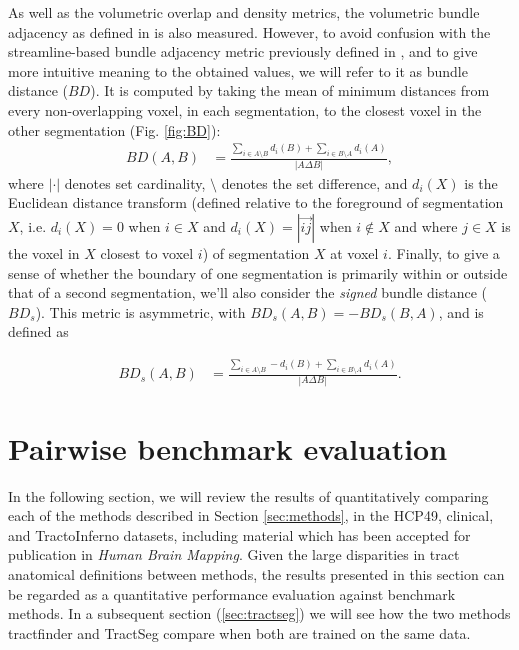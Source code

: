 \documentclass[12pt,phd,a4paper,twoside]{ucl_thesis}
\renewcommand{\textcite}[2][]{
\ifthenelse { \equal {#1} {} }  {\citeauthor{#2}\autocite{#2}}   {\citeauthor{#1}\autocite{#2}}}
\begin{document}
As well as the volumetric overlap and density metrics, the volumetric bundle adjacency as defined in \textcite{Schilling2021a} is also measured.
However, to avoid confusion with the streamline-based bundle adjacency\autocite{Radwan2022, Garyfallidis2012, Rheault2022} metric previously defined in \textcite{Garyfallidis2012},
and to give more intuitive meaning to the obtained values, we will refer to it as bundle distance ($BD$).
It is computed by taking the mean of minimum distances from every non-overlapping voxel, in each segmentation, to the closest voxel in the other segmentation (Fig. \ref{fig:BD}):
\begin{align}
  BD(A,B) &= \frac{\sum_{i \in A\setminus B} d_i(B) + \sum_{i \in B\setminus A} d_i(A)}{|A\Delta B|} \label{eq:bd},
\end{align}
where $| \cdot |$ denotes set cardinality, $\setminus$ denotes the set difference, and $d_i(X)$ is the Euclidean distance transform (defined relative to the foreground of segmentation $X$, i.e. $d_i(X) = 0$ when $i \in X $ and $d_i(X) = |\overrightarrow{ij}|$ when $i \not\in X$ and where $j \in X$ is the voxel in $X$ closest to voxel $i$)  of segmentation $X$ at voxel $i$.
Finally, to give a sense of whether the boundary of one segmentation is primarily within or outside that of a second segmentation, we'll also consider the \textit{signed} bundle distance ($BD_s$).
This metric is asymmetric, with $BD_s (A,B) = -BD_s(B,A)$, and is defined as

\begin{align}
  BD_s(A,B) &= \frac{\sum_{i \in A\setminus B} - d_i(B) + \sum_{i \in B\setminus A} d_i(A)}{|A\Delta B|}. \label{eq:bds}
\end{align}


\section{Pairwise benchmark evaluation}
\label{sec:validation}

In the following section, we will review the results of quantitatively comparing each of the methods described in Section \ref{sec:methods}, in the HCP49, clinical, and TractoInferno datasets, including material which has been accepted for publication in \textit{Human Brain Mapping}\autocite{Young2024}.
Given the large disparities in tract anatomical definitions between methods, the results presented in this section can be regarded as a quantitative performance evaluation against benchmark methods.
In a subsequent section (\ref{sec:tractseg}) we will see how the two methods tractfinder and TractSeg compare when both are trained on the same data.
\end{document}
